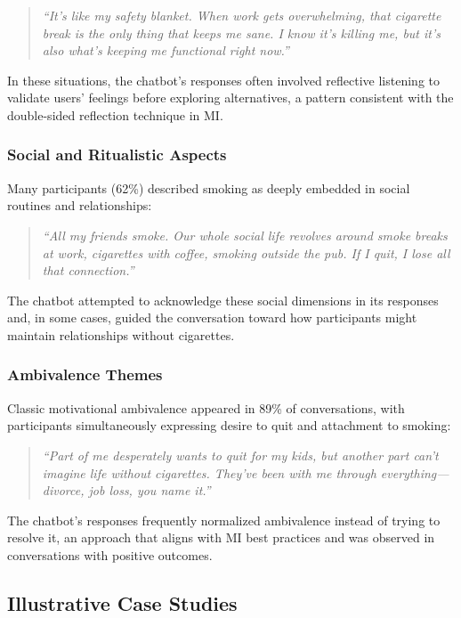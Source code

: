 \begin{quote}
\textit{``It's like my safety blanket. When work gets overwhelming, that cigarette break is the only thing that keeps me sane. I know it's killing me, but it's also what's keeping me functional right now.''}
\end{quote}

In these situations, the chatbot's responses often involved reflective listening to validate users' feelings before exploring alternatives, a pattern consistent with the double-sided reflection technique in MI.

\subsubsection{Social and Ritualistic Aspects}

Many participants (62\%) described smoking as deeply embedded in social routines and relationships:

\begin{quote}
\textit{``All my friends smoke. Our whole social life revolves around smoke breaks at work, cigarettes with coffee, smoking outside the pub. If I quit, I lose all that connection.''}
\end{quote}

The chatbot attempted to acknowledge these social dimensions in its responses and, in some cases, guided the conversation toward how participants might maintain relationships without cigarettes.

\subsubsection{Ambivalence Themes}

Classic motivational ambivalence appeared in 89\% of conversations, with participants simultaneously expressing desire to quit and attachment to smoking:

\begin{quote}
\textit{``Part of me desperately wants to quit for my kids, but another part can't imagine life without cigarettes. They've been with me through everything---divorce, job loss, you name it.''}
\end{quote}

The chatbot's responses frequently normalized ambivalence instead of trying to resolve it, an approach that aligns with MI best practices and was observed in conversations with positive outcomes.

\subsection{Illustrative Case Studies}
\label{sec:case-studies}


